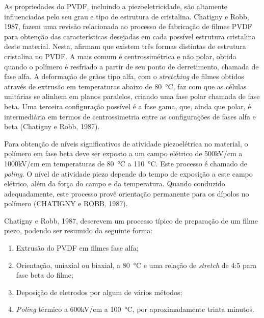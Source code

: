 \documentclass[
	12pt,				
	oneside,			
	a4paper,			
	english,			
	brazil,			
	]{abntex2ppgsi}
\begin{document}
As propriedades do PVDF, incluindo a piezoeletricidade, são altamente influenciadas pelo seu grau e tipo de estrutura de cristalina. Chatigny e Robb, 1987, fazem uma revisão relacionada ao processo de fabricação de filmes PVDF para obtenção das características desejadas em cada possível estrutura cristalina deste material. Nesta, afirmam que existem três formas distintas de estrutura cristalina no PVDF. A mais comum é centrossimétrica e não polar, obtida quando o polímero é resfriado a partir de seu ponto de derretimento, chamada de fase alfa. A deformação de grãos tipo alfa, com o \textit{stretching} de filmes obtidos através de extrusão em temperaturas abaixo de \SI{80}{\celsius}, faz com que as células unitárias se alinhem em planos paralelos, criando uma fase polar chamada de fase beta. Uma terceira configuração possível é a fase gama, que, ainda que polar, é intermediária em termos de centrossimetria entre as configurações de fases alfa e beta (Chatigny e Robb, 1987).

Para obtenção de níveis significativos de atividade piezoelétrica no material, o polímero em fase beta deve ser exposto a um campo elétrico de 500kV/cm a 1000kV/cm em temperaturas de \SI{80}{\celsius} a \SI{110}{\celsius}. Este processo é chamado de \textit{poling}. O nível de atividade piezo depende do tempo de exposição a este campo elétrico, além da força do campo e da temperatura. Quando conduzido adequadamente, este processo provê orientação permanente para os dípolos no polímero (CHATIGNY e ROBB, 1987). 



Chatigny e Robb, 1987, descrevem um processo típico de preparação de um filme piezo, podendo ser resumido da seguinte forma:

\begin{enumerate}
	\item Extrusão do PVDF em filmes fase alfa; 
	\item Orientação, uniaxial ou biaxial, a \SI{80}{\celsius} e uma relação de \textit{stretch} de 4:5 para fase beta do filme;
	\item Deposição de eletrodos por algum de vários métodos;
	\item \textit{Poling} térmico a 600kV/cm a \SI{100}{\celsius}, por aproximadamente trinta minutos.
\end{enumerate}
\end{document}
